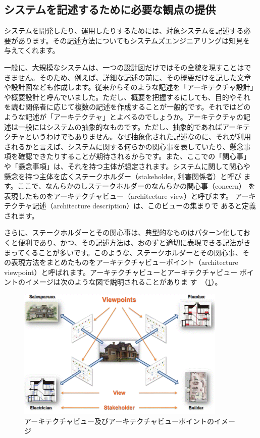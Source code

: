 \subsection{システムを記述するために必要な観点の提供}

システムを開発したり、運用したりするためには、対象システムを記述する必
要があります。その記述方法についてもシステムズエンジニアリングは知見を
与えてくれます。

一般に、大規模なシステムは、一つの設計図だけではその全貌を現すことはで
きません。そのため、例えば、詳細な記述の前に、その概要だけを記した文章
や設計図なども作成します。従来からそのような記述を「アーキテクチャ設計」
や概要設計と呼んでいました。ただし、概要を把握するにしても、目的やそれ
を読む関係者に応じて複数の記述を作成することが一般的です。それではどの
ような記述が「アーキテクチャ」とよべるのでしょうか。アーキテクチャの記
述は一般にはシステムの抽象的なものです。ただし、抽象的であればアーキテ
クチャというわけでもありません。なぜ抽象化された記述なのに、それが利用
されるかと言えば、システムに関する何らかの関心事を表していたり、懸念事
項を確認できたりすることが期待されるからです。また、ここでの「関心事」
や「懸念事項」は、それを持つ主体が想定されます。システムに関して関心や
懸念を持つ主体を広くステークホルダー（stakeholder, 利害関係者）と呼び
ます。ここで、なんらかのしステークホルダーのなんらかの関心事（concern）
を表現したものをアーキテクチャビュー（architecture view）と呼びます。
アーキテクチャ記述（architecture description）は、このビューの集まりで
あると定義されます。

さらに、ステークホルダーとその関心事は、典型的なものはパターン化してお
くと便利であり、かつ、その記述方法は、おのずと適切に表現できる記法がき
まってくることが多いです。このような、ステークホルダーとその関心事、そ
の表現方法をまとめたものをアーキテクチャビューポイント（architecture
  viewpoint）と呼ばれます。アーキテクチャビューとアーキテクチャビュー
ポイントのイメージは次のような図で説明されることがありま
す~（\ref{figure:ch4-3}）。

\begin{figure}
    \begin{center}
    \includegraphics[width=100mm,bb=0 0 515 323]{safety_assurance_contents/ch4images/fig3.png}
    \caption{アーキテクチャビュー及びアーキテクチャビューポイントのイメージ}
    \label{figure:ch4-3}
    \end{center}
\end{figure}

